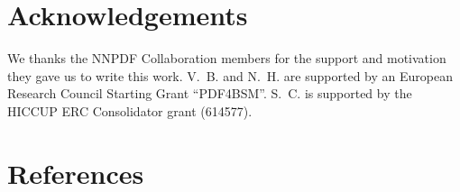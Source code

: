 \documentclass[preprint,12pt]{elsarticle}
\begin{document}
\section*{Acknowledgements}

We thanks the NNPDF Collaboration members for the support and
motivation they gave us to write this work. V.~B. and N.~H. are
supported by an European Research Council Starting Grant ``PDF4BSM''.
S.~C. is supported by the HICCUP ERC Consolidator grant (614577).





\section*{References}








\end{document}
